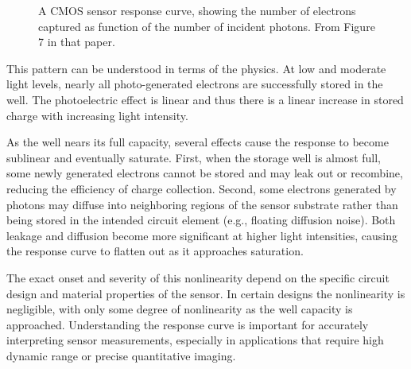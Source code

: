 \documentclass[
  letterpaper,
]{book}
\begin{document}
\begin{figure}


\caption{\label{fig-sensor-linearity}A CMOS sensor response curve,
showing the number of electrons captured as function of the number of
incident photons. From Figure 7 in that paper.}

\end{figure}%

This pattern can be understood in terms of the physics. At low and
moderate light levels, nearly all photo-generated electrons are
successfully stored in the well. The photoelectric effect is linear and
thus there is a linear increase in stored charge with increasing light
intensity.

As the well nears its full capacity, several effects cause the response
to become sublinear and eventually saturate. First, when the storage
well is almost full, some newly generated electrons cannot be stored and
may leak out or recombine, reducing the efficiency of charge collection.
Second, some electrons generated by photons may diffuse into neighboring
regions of the sensor substrate rather than being stored in the intended
circuit element (e.g., floating diffusion noise). Both leakage and
diffusion become more significant at higher light intensities, causing
the response curve to flatten out as it approaches saturation.

The exact onset and severity of this nonlinearity depend on the specific
circuit design and material properties of the sensor. In certain designs
the nonlinearity is negligible, with only some degree of nonlinearity as
the well capacity is approached. Understanding the response curve is
important for accurately interpreting sensor measurements, especially in
applications that require high dynamic range or precise quantitative
imaging.
\end{document}
